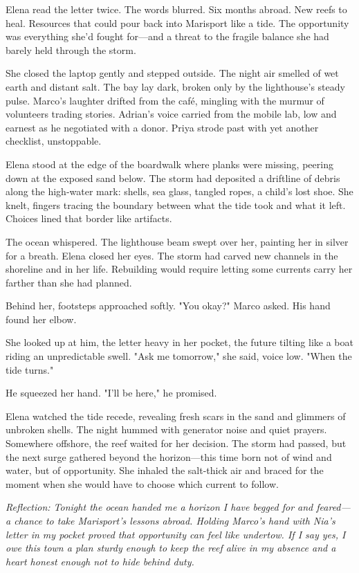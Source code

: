 Elena read the letter twice. The words blurred. Six months abroad. New reefs to heal. Resources that could pour back into Marisport like a tide. The opportunity was everything she'd fought for—and a threat to the fragile balance she had barely held through the storm.

She closed the laptop gently and stepped outside. The night air smelled of wet earth and distant salt. The bay lay dark, broken only by the lighthouse's steady pulse. Marco's laughter drifted from the café, mingling with the murmur of volunteers trading stories. Adrian's voice carried from the mobile lab, low and earnest as he negotiated with a donor. Priya strode past with yet another checklist, unstoppable.

Elena stood at the edge of the boardwalk where planks were missing, peering down at the exposed sand below. The storm had deposited a driftline of debris along the high-water mark: shells, sea glass, tangled ropes, a child's lost shoe. She knelt, fingers tracing the boundary between what the tide took and what it left. Choices lined that border like artifacts.

The ocean whispered. The lighthouse beam swept over her, painting her in silver for a breath. Elena closed her eyes. The storm had carved new channels in the shoreline and in her life. Rebuilding would require letting some currents carry her farther than she had planned.

Behind her, footsteps approached softly. "You okay?" Marco asked. His hand found her elbow.

She looked up at him, the letter heavy in her pocket, the future tilting like a boat riding an unpredictable swell. "Ask me tomorrow," she said, voice low. "When the tide turns."

He squeezed her hand. "I'll be here," he promised.

Elena watched the tide recede, revealing fresh scars in the sand and glimmers of unbroken shells. The night hummed with generator noise and quiet prayers. Somewhere offshore, the reef waited for her decision. The storm had passed, but the next surge gathered beyond the horizon—this time born not of wind and water, but of opportunity. She inhaled the salt-thick air and braced for the moment when she would have to choose which current to follow.

\noindent\textit{Reflection: Tonight the ocean handed me a horizon I have begged for and feared—a chance to take Marisport's lessons abroad. Holding Marco's hand with Nia's letter in my pocket proved that opportunity can feel like undertow. If I say yes, I owe this town a plan sturdy enough to keep the reef alive in my absence and a heart honest enough not to hide behind duty.}
